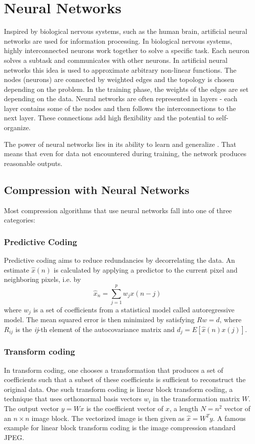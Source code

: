 \section{Neural Networks}
\label{sec:nn}

Inspired by biological nervous systems, such as the human brain, artificial neural networks are used for information processing. In biological nervous systems, highly interconnected neurons work together to solve a specific task. Each neuron solves a subtask and communicates with other neurons. In artificial neural networks this idea is used to approximate arbitrary  non-linear functions. The nodes (neurons) are connected by weighted edges and the topology is chosen depending on the problem. In the training phase, the weights of the edges are set depending on the data. Neural networks are often represented in layers - each layer contains some of the nodes and then follows the interconnections to the next layer. These connections add high flexibility and the potential to self-organize.

The power of neural networks lies in its ability to learn and generalize \cite{Haykin:1998:NNC:521706}. That means that even for data not encountered during training, the network produces reasonable outputs. 

\subsection{Compression with Neural Networks}
Most compression algorithms that use neural networks fall into one of three categories\cite{Dony1995}: 

\subsubsection{Predictive Coding}
Predictive coding aims to reduce redundancies by decorrelating the data. An estimate \(\hat{x}(n)\) is calculated by applying a predictor to the current pixel and neighboring pixels, i.e. by
\begin{equation}
\hat{x}_n = \sum_{j=1}^{p} w_j x(n-j)
\end{equation}
where \({w_j}\) is a set of coefficients from a statistical model called autoregressive model. The mean squared error is then minimized by satisfying \(Rw = d\), where \(R_{ij}\) is the \emph{ij}-th element of the autocovariance matrix and \(d_j = E[\hat{x}(n)x(j)]\).

\subsubsection{Transform coding}
In transform coding, one chooses a transformation that produces a set of coefficients such that a subset of these coefficients is sufficient to reconstruct the original data. One such transform coding is linear block transform coding, a technique that uses orthonormal basis vectors \(w_i\) in the transformation matrix \(W\). The output vector \(y = Wx\) is the coefficient vector of \(x\), a length \(N = n^2\) vector of an \(n \times n\) image block. The vectorized image is then given as \(\hat{x} = W^Ty\). 
A famous example for linear block transform coding is the image compression standard JPEG.

